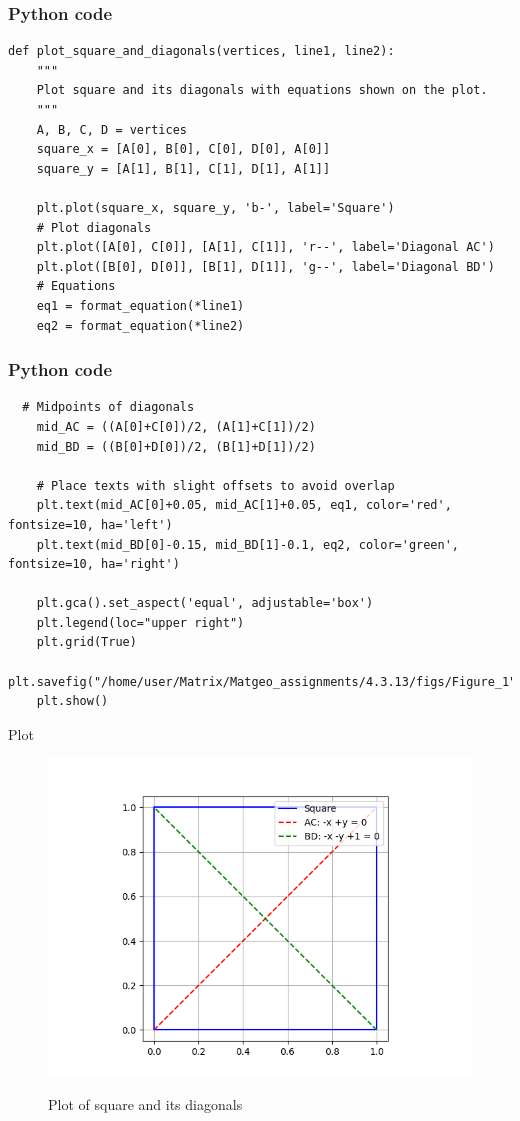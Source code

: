 \documentclass{beamer}
\begin{document}
\begin{frame}[fragile]
    \frametitle{Python code}

    \begin{lstlisting}
def plot_square_and_diagonals(vertices, line1, line2):
    """
    Plot square and its diagonals with equations shown on the plot.
    """
    A, B, C, D = vertices
    square_x = [A[0], B[0], C[0], D[0], A[0]]
    square_y = [A[1], B[1], C[1], D[1], A[1]]
    
    plt.plot(square_x, square_y, 'b-', label='Square') 
    # Plot diagonals
    plt.plot([A[0], C[0]], [A[1], C[1]], 'r--', label='Diagonal AC')
    plt.plot([B[0], D[0]], [B[1], D[1]], 'g--', label='Diagonal BD')
    # Equations
    eq1 = format_equation(*line1)
    eq2 = format_equation(*line2)
    \end{lstlisting}
\end{frame}

\begin{frame}[fragile]
    \frametitle{Python code}

    \begin{lstlisting}
  # Midpoints of diagonals
    mid_AC = ((A[0]+C[0])/2, (A[1]+C[1])/2)
    mid_BD = ((B[0]+D[0])/2, (B[1]+D[1])/2)
    
    # Place texts with slight offsets to avoid overlap
    plt.text(mid_AC[0]+0.05, mid_AC[1]+0.05, eq1, color='red', fontsize=10, ha='left')
    plt.text(mid_BD[0]-0.15, mid_BD[1]-0.1, eq2, color='green', fontsize=10, ha='right')
    
    plt.gca().set_aspect('equal', adjustable='box')
    plt.legend(loc="upper right")
    plt.grid(True)
    plt.savefig("/home/user/Matrix/Matgeo_assignments/4.3.13/figs/Figure_1")
    plt.show()
    \end{lstlisting}
\end{frame}

\begin{frame}{Plot}
    \begin{figure}[H]
    \centering
    \caption{Plot of square and its diagonals}
    \includegraphics[width=0.6\columnwidth]{figs/Figure_1.png}
    \label{fig:1}
    \end{figure}
\end{frame}
\end{document}
